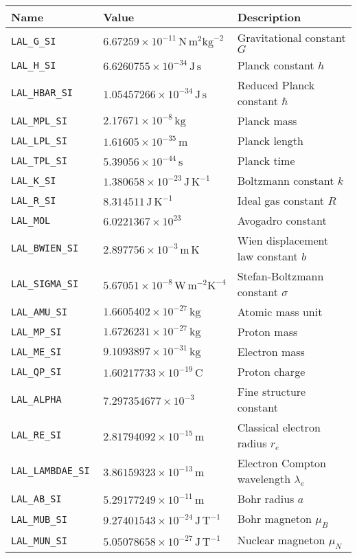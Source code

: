 \documentclass[10pt]{ligodcc}
\begin{document}
\begin{center}
\begin{tabular}{|lll|}
\hline
Name & Value & Description \\
\hline
\tt LAL\_G\_SI     & $6.67259\times10^{-11}\,\mathrm{N}\,\mathrm{m}^{2}
        \mathrm{kg}^{-2}$ & Gravitational constant $G$ \\
\tt LAL\_H\_SI     & $6.6260755\times10^{-34}\,\mathrm{J}\,\mathrm{s}$ &
        Planck constant $h$ \\
\tt LAL\_HBAR\_SI  & $1.05457266\times10^{-34}\,\mathrm{J}\,\mathrm{s}$ &
        Reduced Planck constant $\hbar$ \\
\tt LAL\_MPL\_SI   & $2.17671\times10^{-8}\,\mathrm{kg}$ & Planck mass \\
\tt LAL\_LPL\_SI   & $1.61605\times10^{-35}\,\mathrm{m}$ & Planck length \\
\tt LAL\_TPL\_SI   & $5.39056\times10^{-44}\,\mathrm{s}$ & Planck time \\
\tt LAL\_K\_SI     & $1.380658\times10^{-23}\,\mathrm{J}\,\mathrm{K}^{-1}$ &
        Boltzmann constant $k$ \\
\tt LAL\_R\_SI     & $8.314511\,\mathrm{J}\,\mathrm{K}^{-1}$ &
        Ideal gas constant $R$ \\
\tt LAL\_MOL       & $6.0221367\times10^{23}$ & Avogadro constant \\
\tt LAL\_BWIEN\_SI & $2.897756\times10^{-3}\,\mathrm{m}\,\mathrm{K}$ &
        Wien displacement law constant $b$ \\
\tt LAL\_SIGMA\_SI & $5.67051\times10^{-8}\,\mathrm{W}\,\mathrm{m}^{-2}
        \mathrm{K}^{-4}$ & Stefan-Boltzmann constant $\sigma$ \\
\tt LAL\_AMU\_SI   & $1.6605402\times10^{-27}\,\mathrm{kg}$ &
        Atomic mass unit \\
\tt LAL\_MP\_SI    & $1.6726231\times10^{-27}\,\mathrm{kg}$ & Proton mass \\
\tt LAL\_ME\_SI    & $9.1093897\times10^{-31}\,\mathrm{kg}$ & Electron mass \\
\tt LAL\_QP\_SI    & $1.60217733\times10^{-19}\,\mathrm{C}$ & Proton charge \\
\tt LAL\_ALPHA     & $7.297354677\times10^{-3}$ & Fine structure constant \\
\tt LAL\_RE\_SI    & $2.81794092\times10^{-15}\,\mathrm{m}$ &
        Classical electron radius $r_e$ \\
\tt LAL\_LAMBDAE\_SI & $3.86159323\times10^{-13}\,\mathrm{m}$ &
        Electron Compton wavelength $\lambda_e$ \\
\tt LAL\_AB\_SI    & $5.29177249\times10^{-11}\,\mathrm{m}$ & Bohr radius $a$\\
\tt LAL\_MUB\_SI   & $9.27401543\times10^{-24}\,\mathrm{J}\,\mathrm{T}^{-1}$ &
        Bohr magneton $\mu_B$ \\
\tt LAL\_MUN\_SI   & $5.05078658\times10^{-27}\,\mathrm{J}\,\mathrm{T}^{-1}$ &
        Nuclear magneton $\mu_N$ \\
\hline
\end{tabular}
\end{center}
\end{document}
